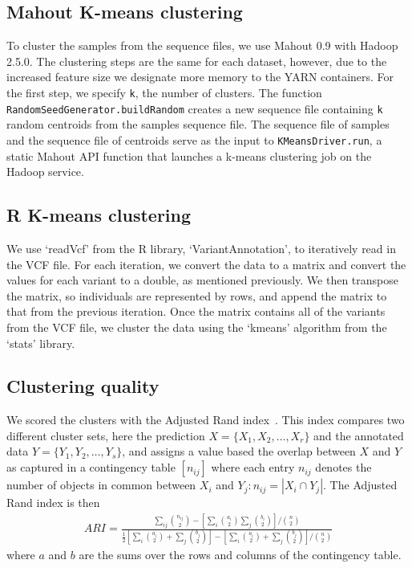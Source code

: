 \documentclass{bioinfo}
\begin{document}
\begin{methods}
\subsection*{Mahout K-means clustering}
To cluster the samples from the sequence files, we use Mahout 0.9 with Hadoop 2.5.0. 
The clustering steps are the same for each dataset, however, due to the increased feature size we designate more memory to the
YARN containers. For the first step, we specify \texttt{k},
the number of clusters. The function \texttt{RandomSeedGenerator.buildRandom} creates a new sequence file containing \texttt{k}
random centroids from the samples sequence file. The sequence file
of samples and the sequence file of centroids serve as the input to \texttt{KMeansDriver.run}, a static Mahout API function that launches
a k-means clustering job on the Hadoop service. 


\subsection*{R K-means clustering}
We use `readVcf' from the R library, `VariantAnnotation', to iteratively read in the VCF file. For each iteration, we convert the data to a matrix and
convert the values for each variant to a double, as mentioned previously. We then transpose the matrix, so individuals are represented
by rows, and append the matrix to that from the previous iteration. Once the matrix contains all of the variants from the VCF file, we cluster the data
using the `kmeans' algorithm from the `stats' library.



\subsection*{Clustering quality}
We scored the clusters with the Adjusted Rand index~\cite{Hubert1985}. 
This index compares two different cluster sets, here the prediction $X = \{ X_1, X_2, \ldots , X_r \}$ and the annotated data $Y = \{ Y_1, Y_2, \ldots , Y_s \}$, and assigns a value based the overlap between $X$ and $Y$ as captured in a contingency table $\left[n_{ij}\right]$ where each entry $n_{ij}$ denotes the number of objects in common between $X_i$ and $Y_j : n_{ij}=|X_i \cap Y_j|$. 
The Adjusted Rand index is then 
{\tiny
\begin{eqnarray*}
ARI=\frac{\sum_{ij}{{n_{ij}\choose 2}} - \left[ \sum_{i}{{a_i\choose2}} \sum_{j}{{b_i\choose2}} \right] / {n\choose2}}{\frac{1}{2} \left[ \sum_{i}{{a_{i}\choose 2} + \sum_{j}{{b_{j}\choose 2}}} \right] - \left[ \sum_{i}{{a_{i}\choose 2} + \sum_{j}{{b_{j}\choose 2}}} \right] / {n\choose2}} 
\end{eqnarray*}
}
where $a$ and $b$ are the sums over the rows and columns of the contingency table.


\end{methods}
\end{document}
